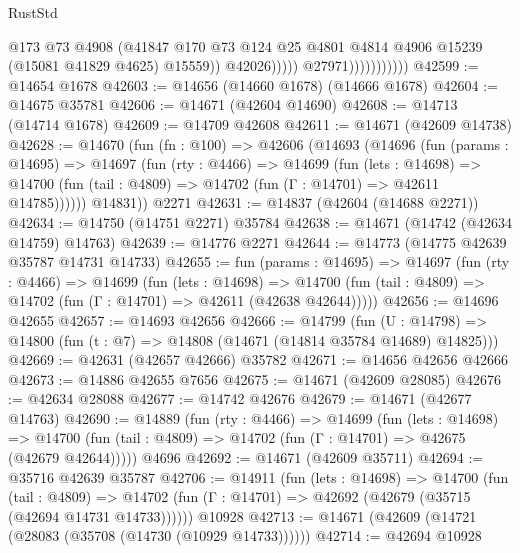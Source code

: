 \begin{lexlean}{RustStd}
\begin{coremodule}
                                      @173
                                      @73
                                      @4908
                                      (@41847
                                        @170
                                        @73
                                        @124
                                        @25
                                        @4801
                                        @4814
                                        @4906
                                        @15239
                                        (@15081 @41829 @4625)
                                        @15559))
                                    @42026)))))
                          @27971)))))))))))
@42599 := @14654 @1678
@42603 := @14656 (@14660 @1678) (@14666 @1678)
@42604 := @14675 @35781
@42606 := @14671 (@42604 @14690)
@42608 := @14713 (@14714 @1678)
@42609 := @14709 @42608
@42611 := @14671 (@42609 @14738)
@42628 := @14670
    (fun (fn : @100) =>
    @42606
      (@14693
        (@14696
          (fun (params : @14695) =>
          @14697
            (fun (rty : @4466) =>
            @14699
              (fun (lets : @14698) =>
              @14700 (fun (tail : @4809) => @14702 (fun (Γ : @14701) => @42611 @14785))))))
        @14831))
    @2271
@42631 := @14837 (@42604 (@14688 @2271))
@42634 := @14750 (@14751 @2271) @35784
@42638 := @14671 (@14742 (@42634 @14759) @14763)
@42639 := @14776 @2271
@42644 := @14773 (@14775 @42639 @35787 @14731 @14733)
@42655 := fun (params : @14695) =>
  @14697
    (fun (rty : @4466) =>
    @14699
      (fun (lets : @14698) =>
      @14700 (fun (tail : @4809) => @14702 (fun (Γ : @14701) => @42611 (@42638 @42644)))))
@42656 := @14696 @42655
@42657 := @14693 @42656
@42666 := @14799
    (fun (U : @14798) => @14800 (fun (t : @7) => @14808 (@14671 (@14814 @35784 @14689) @14825)))
@42669 := @42631 (@42657 @42666) @35782
@42671 := @14656 @42656 @42666
@42673 := @14886 @42655 @7656
@42675 := @14671 (@42609 @28085)
@42676 := @42634 @28088
@42677 := @14742 @42676
@42679 := @14671 (@42677 @14763)
@42690 := @14889
    (fun (rty : @4466) =>
    @14699
      (fun (lets : @14698) =>
      @14700 (fun (tail : @4809) => @14702 (fun (Γ : @14701) => @42675 (@42679 @42644)))))
    @4696
@42692 := @14671 (@42609 @35711)
@42694 := @35716 @42639 @35787
@42706 := @14911
    (fun (lets : @14698) =>
    @14700
      (fun (tail : @4809) =>
      @14702 (fun (Γ : @14701) => @42692 (@42679 (@35715 (@42694 @14731 @14733))))))
    @10928
@42713 := @14671 (@42609 (@14721 (@28083 (@35708 (@14730 (@10929 @14733))))))
@42714 := @42694 @10928

\end{coremodule}
\end{lexlean}
